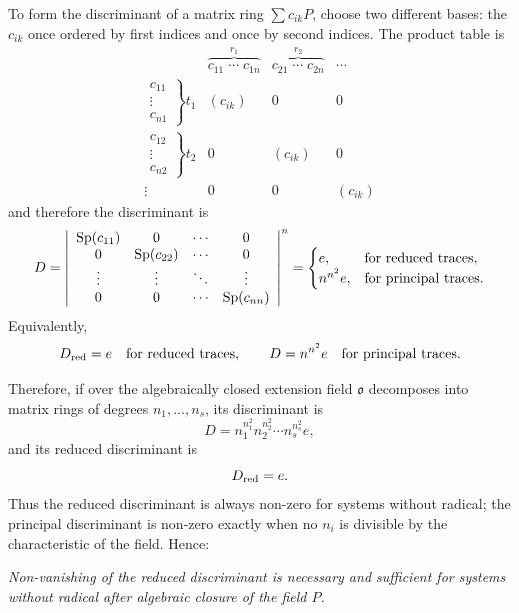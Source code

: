 \documentclass[11pt]{article}
\providecommand{\mo}{\mathfrak{o}}
\begin{document}
To form the discriminant of a matrix ring $\sum c_{ik}P$, choose two different bases: the $c_{ik}$ once ordered by first indices and once by second indices. The product table is
\[
\begin{array}{c|ccc}
& \overbrace{c_{11}\;\cdots\;c_{1n}}^{r_1}
& \overbrace{c_{21}\;\cdots\;c_{2n}}^{r_2}
& \cdots \\ \hline
\left.\begin{array}{c}c_{11}\\[-1mm]\vdots\\[-1mm]c_{n1}\end{array}\right\}t_1
& (c_{ik}) & 0 & 0 \\[1.3em]
\left.\begin{array}{c}c_{12}\\[-1mm]\vdots\\[-1mm]c_{n2}\end{array}\right\}t_2
& 0 & (c_{ik}) & 0 \\[1.3em]
\vdots & 0 & 0 & (c_{ik})
\end{array}
\]
and therefore the discriminant is
\[
        D=\left|\begin{array}{cccc}
        \operatorname{Sp}(c_{11})&0&\cdots&0\\
        0&\operatorname{Sp}(c_{22})&\cdots&0\\
        \vdots&\vdots&\ddots&\vdots\\
        0&0&\cdots&\operatorname{Sp}(c_{nn})
        \end{array}\right|^{n}
        =\begin{cases}
        e, & \hbox{for reduced traces},\\
        n^{n^2}e, & \hbox{for principal traces}.
        \end{cases}
\]
Equivalently,
\[
        D_{\rm red}=e
        \quad\hbox{for reduced traces},
        \qquad
        D=n^{n^2}e
        \quad\hbox{for principal traces}.
\]

Therefore, if over the algebraically closed extension field $\mo$ decomposes into matrix rings of degrees $n_1,\ldots,n_s$, its discriminant is
\[
        D=n_1^{n_1^2}n_2^{n_2^2}\cdots n_s^{n_s^2}e,
\]
and its reduced discriminant is
\[
        D_{\rm red}=e.
\]
Thus the reduced discriminant is always non-zero for systems without radical; the principal discriminant is non-zero exactly when no $n_i$ is divisible by the characteristic of the field. Hence:

\emph{Non-vanishing of the reduced discriminant is necessary and sufficient for systems without radical after algebraic closure of the field $P$.}
\end{document}
